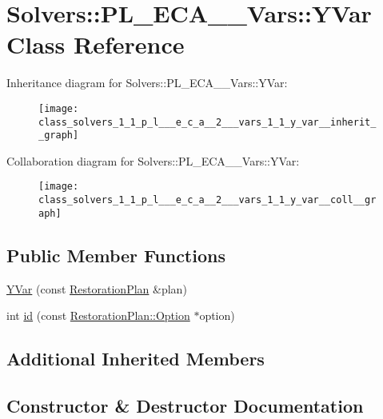 \hypertarget{class_solvers_1_1_p_l___e_c_a__2___vars_1_1_y_var}{}\section{Solvers\+:\+:P\+L\+\_\+\+E\+C\+A\+\_\+\_\+\+Vars\+:\+:Y\+Var Class Reference}
\label{class_solvers_1_1_p_l___e_c_a__2___vars_1_1_y_var}


Inheritance diagram for Solvers\+:\+:P\+L\+\_\+\+E\+C\+A\+\_\+\_\+\+Vars\+:\+:Y\+Var\+:\nopagebreak
\begin{figure}[H]
\begin{center}
\leavevmode
\texttt{[image: class\_solvers\_1\_1\_p\_l\_\_\_e\_c\_a\_\_2\_\_\_vars\_1\_1\_y\_var\_\_inherit\_\_graph]}
\end{center}
\end{figure}


Collaboration diagram for Solvers\+:\+:P\+L\+\_\+\+E\+C\+A\+\_\+\_\+\+Vars\+:\+:Y\+Var\+:\nopagebreak
\begin{figure}[H]
\begin{center}
\leavevmode
\texttt{[image: class\_solvers\_1\_1\_p\_l\_\_\_e\_c\_a\_\_2\_\_\_vars\_1\_1\_y\_var\_\_coll\_\_graph]}
\end{center}
\end{figure}
\subsection*{Public Member Functions}
\begin{DoxyCompactItemize}
\item 
\hyperlink{class_solvers_1_1_p_l___e_c_a__2___vars_1_1_y_var_a09273e2dc833466d8780aa1438c4e6ae}{Y\+Var} (const \hyperlink{class_restoration_plan}{Restoration\+Plan} \&plan)
\item 
int \hyperlink{class_solvers_1_1_p_l___e_c_a__2___vars_1_1_y_var_aa36d75e4a0ce6e89744070a658d0d2e0}{id} (const \hyperlink{class_restoration_plan_1_1_option}{Restoration\+Plan\+::\+Option} $\ast$option)
\end{DoxyCompactItemize}
\subsection*{Additional Inherited Members}


\subsection{Constructor \& Destructor Documentation}
\mbox{\label{class_solvers_1_1_p_l___e_c_a__2___vars_1_1_y_var_a09273e2dc833466d8780aa1438c4e6ae}} 
